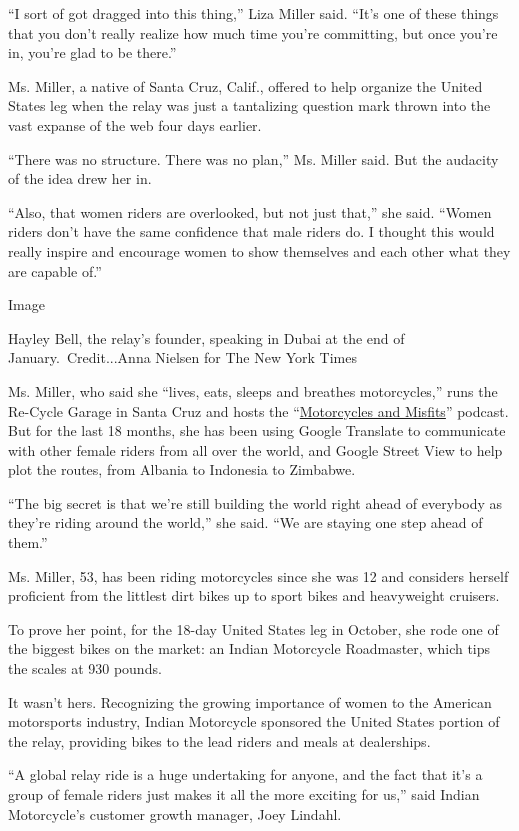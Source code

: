 ``I sort of got dragged into this thing,'' Liza Miller said. ``It's one
of these things that you don't really realize how much time you're
committing, but once you're in, you're glad to be there.''

Ms. Miller, a native of Santa Cruz, Calif., offered to help organize the
United States leg when the relay was just a tantalizing question mark
thrown into the vast expanse of the web four days earlier.

``There was no structure. There was no plan,'' Ms. Miller said. But the
audacity of the idea drew her in.

``Also, that women riders are overlooked, but not just that,'' she said.
``Women riders don't have the same confidence that male riders do. I
thought this would really inspire and encourage women to show themselves
and each other what they are capable of.''

Image

Hayley Bell, the relay's founder, speaking in Dubai at the end of
January.~Credit...Anna Nielsen for The New York Times

Ms. Miller, who said she ``lives, eats, sleeps and breathes
motorcycles,'' runs the Re-Cycle Garage in Santa Cruz and hosts the
``\href{http://motorcyclesandmisfits.com/}{Motorcycles and Misfits}''
podcast. But for the last 18 months, she has been using Google Translate
to communicate with other female riders from all over the world, and
Google Street View to help plot the routes, from Albania to Indonesia to
Zimbabwe.

``The big secret is that we're still building the world right ahead of
everybody as they're riding around the world,'' she said. ``We are
staying one step ahead of them.''

Ms. Miller, 53, has been riding motorcycles since she was 12 and
considers herself proficient from the littlest dirt bikes up to sport
bikes and heavyweight cruisers.

To prove her point, for the 18-day United States leg in October, she
rode one of the biggest bikes on the market: an Indian Motorcycle
Roadmaster, which tips the scales at 930 pounds.

It wasn't hers. Recognizing the growing importance of women to the
American motorsports industry, Indian Motorcycle sponsored the United
States portion of the relay, providing bikes to the lead riders and
meals at dealerships.

``A global relay ride is a huge undertaking for anyone, and the fact
that it's a group of female riders just makes it all the more exciting
for us,'' said Indian Motorcycle's customer growth manager, Joey
Lindahl.

